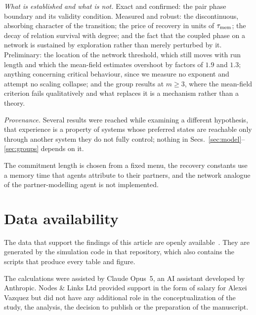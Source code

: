 \documentclass[aps,pre,twocolumn,superscriptaddress,floatfix,longbibliography]{revtex4-2}
\begin{document}
\emph{What is established and what is not.} Exact and confirmed: the pair
phase boundary and its validity condition. Measured and robust: the
discontinuous, absorbing character of the transition; the price of recovery in
units of $\tau_{\rm mem}$; the decay of relation survival with degree; and the
fact that the coupled phase on a network is sustained by exploration rather than
merely perturbed by it. Preliminary: the location of the network threshold,
which still moves with run length and which the mean-field estimates overshoot
by factors of $1.9$ and $1.3$; anything concerning critical behaviour, since we
measure no exponent and attempt no scaling collapse; and the group results at
$m\ge3$, where the mean-field criterion fails qualitatively and what replaces it
is a mechanism rather than a theory.

\emph{Provenance.} Several results were reached while
examining a different hypothesis, that experience is a property of systems whose
preferred states are reachable only through another system they do not fully
control; nothing in Secs.~\ref{sec:model}--\ref{sec:groups} depends on it.

The commitment length is chosen
from a fixed menu, the recovery constants use a memory time that agents
attribute to their partners, and the network analogue of the partner-modelling
agent is not implemented.

\section*{Data availability}
The data that support the findings of this article are openly available~\cite{code}.
They are generated by the simulation code in that repository, which also
contains the scripts that produce every table and figure.

\begin{acknowledgments}
The calculations were assisted by Claude Opus~5, an AI assistant developed by
Anthropic. Nodes \& Links Ltd provided support in the form of salary for Alexei
Vazquez but did not have any additional role in the conceptualization of the
study, the analysis, the decision to publish or the preparation of the
manuscript.
\end{acknowledgments}


\end{document}
